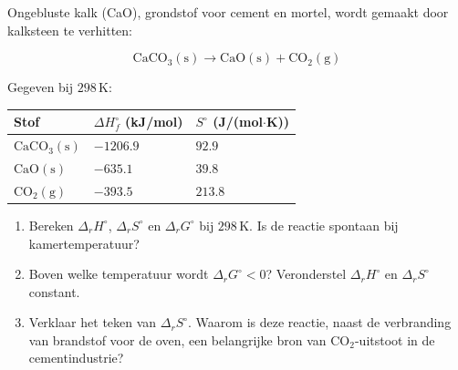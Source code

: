 \begin{oefening}\label{oef:h3-9}
Ongebluste kalk (CaO), grondstof voor cement en mortel, wordt gemaakt door kalksteen te verhitten:

\[
\mathrm{CaCO_3(s) \rightarrow CaO(s) + CO_2(g)}
\]

Gegeven bij \(298\,\mathrm{K}\):

\begin{center}
\begin{tabular}{lll}
\toprule
Stof & \(\Delta H_f^\circ\) (kJ/mol) & \(S^\circ\) (J/(mol\ensuremath{\cdot{}}K)) \\
\midrule
\(\mathrm{CaCO_3(s)}\) & \(-1206.9\) & \(92.9\) \\
\(\mathrm{CaO(s)}\) & \(-635.1\) & \(39.8\) \\
\(\mathrm{CO_2(g)}\) & \(-393.5\) & \(213.8\) \\
\bottomrule
\end{tabular}
\end{center}

\begin{enumerate}
\item[(a)]
  Bereken \(\Delta_r H^\circ\), \(\Delta_r S^\circ\) en \(\Delta_r G^\circ\) bij \(298\,\mathrm{K}\). Is de reactie spontaan bij kamertemperatuur?
\item[(b)]
  Boven welke temperatuur wordt \(\Delta_r G^\circ < 0\)? Veronderstel \(\Delta_r H^\circ\) en \(\Delta_r S^\circ\) constant.
\item[(c)]
  Verklaar het teken van \(\Delta_r S^\circ\). Waarom is deze reactie, naast de verbranding van brandstof voor de oven, een belangrijke bron van \(\mathrm{CO_2}\)-uitstoot in de cementindustrie?
\end{enumerate}
\end{oefening}
